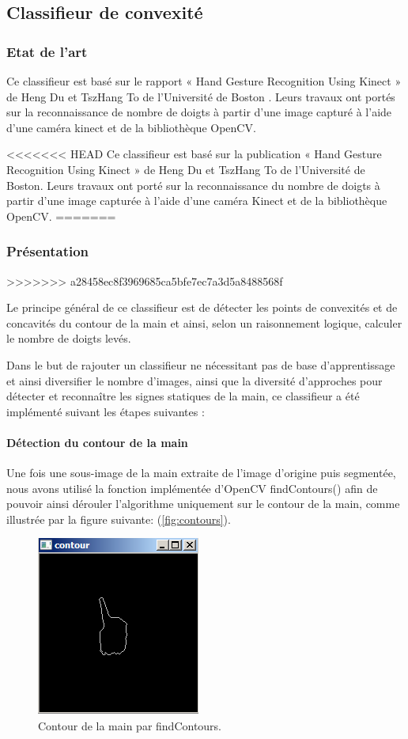 \subsection{Classifieur de convexité}
\subsubsection{Etat de l'art}
Ce classifieur est basé sur le rapport « Hand Gesture Recognition Using Kinect » de Heng Du et TszHang To de l’Université de Boston \cite{hengDuEtAl}.  Leurs travaux ont portés sur la reconnaissance de nombre de doigts à partir d’une image capturé à l’aide d’une caméra kinect et de la bibliothèque OpenCV. 

<<<<<<< HEAD
Ce classifieur est basé sur la publication « Hand Gesture Recognition Using Kinect » de Heng Du et TszHang To de l’Université de Boston.  Leurs travaux ont porté sur la reconnaissance du nombre de doigts à partir d’une image capturée à l’aide d’une caméra Kinect et de la bibliothèque OpenCV. 
=======
\subsubsection{Présentation}
>>>>>>> a28458ec8f3969685ca5bfe7ec7a3d5a8488568f

Le principe général de ce classifieur est de détecter les points de convexités et de concavités du contour de la main et ainsi, selon un raisonnement logique, calculer le nombre de doigts levés.

Dans le but de rajouter un classifieur ne nécessitant pas de base d’apprentissage et ainsi diversifier le nombre d’images, ainsi que la diversité d’approches pour détecter et reconnaître les signes statiques de la main, ce classifieur a été implémenté suivant les étapes suivantes :

\paragraph{Détection du contour de la main}
Une fois une sous-image de la main extraite de l’image d’origine puis segmentée, nous avons utilisé la fonction implémentée d’OpenCV findContours() afin de pouvoir ainsi dérouler l’algorithme uniquement sur le contour de la main, comme illustrée par la figure suivante:  (\autoref{fig:contours}).

\begin{figure}[htb!]
\centerline{\includegraphics{contours.png}}
\caption{Contour de la main par findContours.}
\label{fig:contours}
\end{figure}

